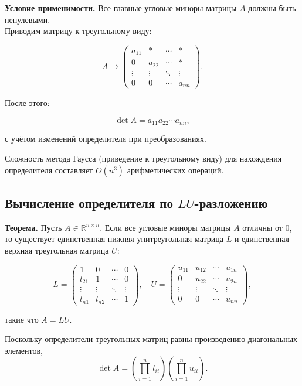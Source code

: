 \textbf{Условие применимости.} Все главные угловые миноры матрицы $A$ должны быть ненулевыми.\\

Приводим матрицу к треугольному виду:

\[
A \to
\begin{pmatrix}
	a_{11} & * & \cdots & * \\
	0 & a_{22} & \cdots & * \\
	\vdots & \vdots & \ddots & \vdots \\
	0 & 0 & \cdots & a_{nn}
\end{pmatrix}.
\]

После этого:

\[
\det A = a_{11}a_{22}\cdots a_{nn},
\]

с учётом изменений определителя при преобразованиях.

Сложность метода Гаусса (приведение к треугольному виду) для нахождения определителя составляет $O(n^3)$ арифметических операций.


\subsection{Вычисление определителя по $LU$-разложению}

\textbf{Теорема.} Пусть $A \in \mathbb{R}^{n \times n}$. Если все угловые миноры матрицы $A$ отличны от 0, то существует единственная нижняя унитреугольная матрица $L$ и единственная верхняя треугольная матрица $U$:

\[
L = 
\begin{pmatrix}
	1 & 0 & \cdots & 0 \\
	l_{21} & 1 & \cdots & 0 \\
	\vdots & \vdots & \ddots & \vdots \\
	l_{n1} & l_{n2} & \cdots & 1
\end{pmatrix}, \quad 
U = 
\begin{pmatrix}
	u_{11} & u_{12} & \cdots & u_{1n} \\
	0 & u_{22} & \cdots & u_{2n} \\
	\vdots & \vdots & \ddots & \vdots \\
	0 & 0 & \cdots & u_{nn}
\end{pmatrix},
\]

такие что $A = LU$.

Поскольку определители треугольных матриц равны произведению диагональных элементов,  
\[
\det A = \left( \prod_{i=1}^n l_{ii} \right) \left( \prod_{i=1}^n u_{ii} \right).
\]

